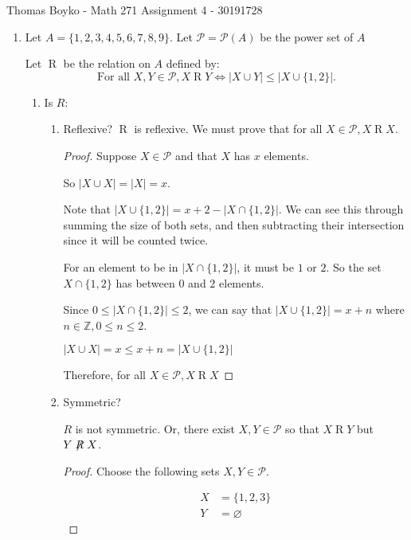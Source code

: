 \documentclass[]{article}
\begin{document}
    \huge Thomas Boyko - Math 271 Assignment 4 - 30191728
    \normalsize 
    \begin{enumerate} 
        \item Let $A=\{1,2,3,4,5,6,7,8,9\}$. Let $\mathcal{P}=\mathcal{P}(A)$ be the power set of $A$

        Let $\mathrel{R}$ be the relation on $A$ defined by:
        \[\text{For all } X,Y\in\mathcal{P}, X\mathrel{R}Y\iff|X\cup Y|\leq|X\cup\{1,2\}|.\]
        \begin{enumerate}[label= (\alph*)]
        \item Is $R$:
        \begin{enumerate}[label= (\roman*)] 
            \item Reflexive?
                $\mathrel{R}$ is reflexive. We must prove that for all $X\in \mathcal{P}, X\mathrel{R}X$.
                \begin{proof}
                    Suppose $X\in \mathcal{P}$ and that $X$ has $x$ elements.

                    So $|X\cup X|=|X|=x$.

                    Note that $|X\cup \{1,2\}| = x+2-|X\cap \{1,2\}|$. We can see this through summing
                    the size of both sets, and then subtracting their intersection since it will be 
                    counted twice.

                    For an element to be in $|X\cap \{1,2\}|$, it must be $1$ or $2$. So the set $X\cap \{1,2\}$
                    has between $0$ and $2$ elements.

                    Since $0\leq|X\cap \{1,2\}|\leq2$, we can say that 
                    $|X\cup \{1,2\}| = x+n$ where $n\in\mathbb{Z}, 0\leq n\leq2$.

                    $|X\cup X|=x\leq x+n=|X\cup \{1,2\}|$

                    Therefore, for all $X\in\mathcal{P},X\mathrel{R}X$
                \end{proof}
            \item Symmetric?
            
            $R$ is not symmetric. Or, there exist $X,Y\in \mathcal{P}$ so that $X\mathrel{R}Y$ but $Y\not\mathrel{R} X$.
            \begin{proof}

                Choose the following sets $X,Y\in\mathcal{P}$.

                \begin{align*} 
                    X&=\{1,2,3\}\\
                    Y&=\varnothing
                \end{align*}


\end{proof}
\end{enumerate}
\end{enumerate}
\end{enumerate}
\end{document}
